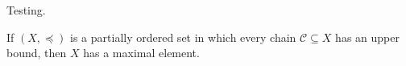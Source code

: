 \documentclass{kaohandt}
\begin{document}
  Testing.
  \begin{theorem}[A Theorem]
    If $\left(X,\preceq\right)$ is a partially ordered set in which every chain $\mathcal{C}\subseteq X$ has an upper bound, then $X$ has a maximal element.
  \end{theorem}
\end{document}

